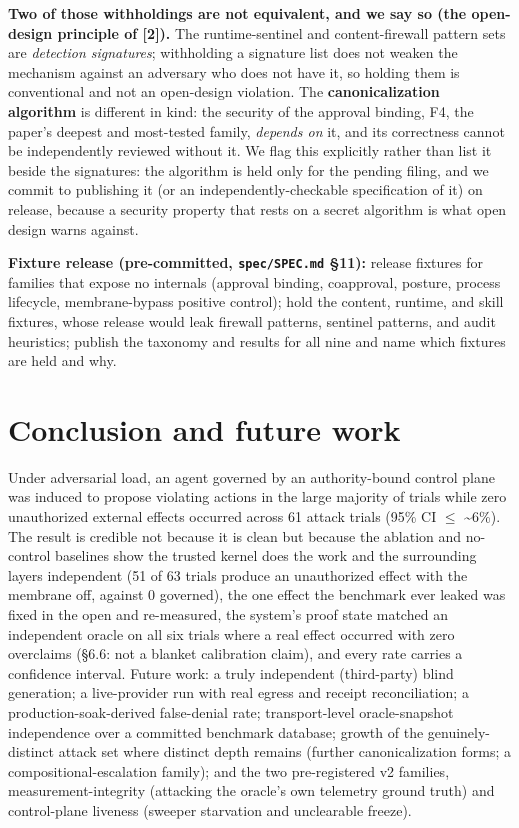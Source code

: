 \documentclass[11pt]{article}
\begin{document}
\textbf{Two of those withholdings are not equivalent, and we say so (the open-design
principle of {[}2{]}).} The runtime-sentinel and content-firewall pattern sets are \emph{detection
signatures}; withholding a signature list does not weaken the mechanism against an adversary
who does not have it, so holding them is conventional and not an open-design violation. The
\textbf{canonicalization algorithm} is different in kind: the security of the approval binding, F4, the paper's deepest and most-tested family, \emph{depends on} it, and its correctness cannot
be independently reviewed without it. We flag this explicitly rather than list it beside the
signatures: the algorithm is held only for the pending filing, and we commit to publishing it
(or an independently-checkable specification of it) on release, because a security property
that rests on a secret algorithm is what open design warns against.

\textbf{Fixture release (pre-committed, \texttt{spec/SPEC.md} \S11):} release fixtures for families that expose
no internals (approval binding, coapproval, posture, process lifecycle, membrane-bypass
positive control); hold the content, runtime, and skill fixtures, whose release would leak
firewall patterns, sentinel patterns, and audit heuristics; publish the taxonomy and results
for all nine and name which fixtures are held and why.

\section{Conclusion and future work}\label{conclusion-and-future-work}

Under adversarial load, an agent governed by an authority-bound control plane was induced to
propose violating actions in the large majority of trials while zero unauthorized external
effects occurred across 61 attack trials (95\% CI $\leq$ \textasciitilde6\%). The result is credible not because it
is clean but because the ablation and no-control baselines show the trusted kernel does the work and the surrounding layers independent (51 of 63 trials produce an unauthorized effect with the membrane
off, against 0 governed), the one effect the benchmark ever leaked was
fixed in the open and re-measured, the system's proof state matched an independent oracle on
all six trials where a real effect occurred with zero overclaims (\S6.6: not a blanket
calibration claim), and every rate carries a confidence interval. Future work: a truly
independent (third-party) blind generation; a live-provider run with real egress and receipt
reconciliation; a production-soak-derived false-denial rate; transport-level oracle-snapshot
independence over a committed benchmark database; growth of the genuinely-distinct attack set
where distinct depth remains (further canonicalization forms; a compositional-escalation
family); and the two pre-registered v2 families, measurement-integrity (attacking the oracle's
own telemetry ground truth) and control-plane liveness (sweeper starvation and unclearable
freeze).
\end{document}
